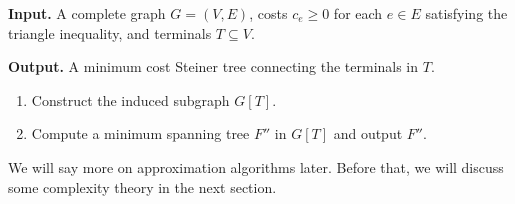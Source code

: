 \begin{mdframed}[
    linewidth=1pt,
    linecolor=black,
    bottomline=false,topline=false,rightline=false,
    innerrightmargin=0pt,innertopmargin=0pt,innerbottommargin=0pt,
    innerleftmargin=1em,%
    skipabove=0.75\baselineskip
]
{\bf Input.} A complete graph $G = (V, E)$, costs $c_e \geq 0$ for each $e \in E$ 
satisfying the triangle inequality, and terminals $T \subseteq V$. 

{\bf Output.} A minimum cost Steiner tree connecting the terminals in $T$.
\begin{enumerate}[leftmargin=1.75cm, label={Step \arabic*.}]
    \item Construct the induced subgraph $G[T]$.
    \item Compute a minimum spanning tree $F''$ in $G[T]$ and output $F''$.
\end{enumerate}
\end{mdframed}\vspace{-0.35cm}
We will say more on approximation algorithms later. Before that, we will 
discuss some complexity theory in the next section.